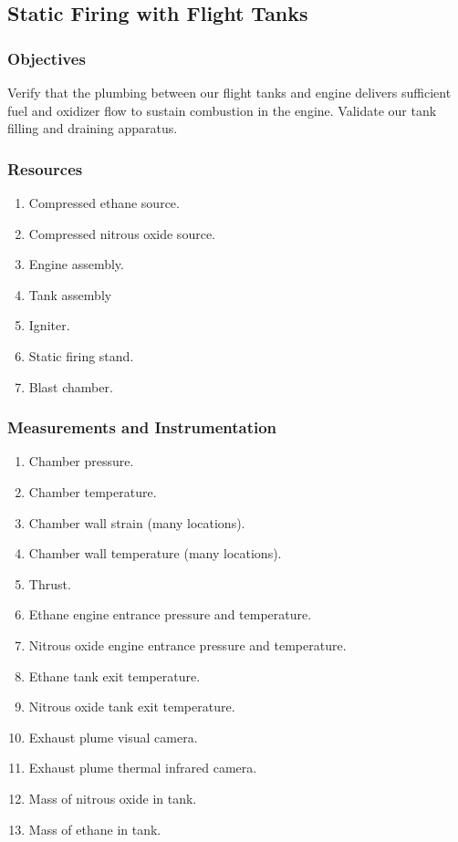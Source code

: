 \documentclass{article}
\begin{document}
\subsection{Static Firing with Flight Tanks}
\subsubsection{Objectives}
Verify that the plumbing between our flight tanks and engine delivers sufficient fuel and oxidizer flow to sustain combustion in the engine. Validate our tank filling and draining apparatus.
\subsubsection{Resources}
\begin{enumerate}
\item Compressed ethane source.
\item Compressed nitrous oxide source.
\item Engine assembly.
\item Tank assembly
\item Igniter.
\item Static firing stand.
\item Blast chamber.
\end{enumerate}
\subsubsection{Measurements and Instrumentation}
\begin{enumerate}
\item Chamber pressure.
\item Chamber temperature.
\item Chamber wall strain (many locations).
\item Chamber wall temperature (many locations).
\item Thrust.
\item Ethane engine entrance pressure and temperature.
\item Nitrous oxide engine entrance pressure and temperature.
\item Ethane tank exit temperature.
\item Nitrous oxide tank exit temperature.
\item Exhaust plume visual camera.
\item Exhaust plume thermal infrared camera.
\item Mass of nitrous oxide in tank. %
\item Mass of ethane in tank. %
\end{enumerate}
\end{document}
